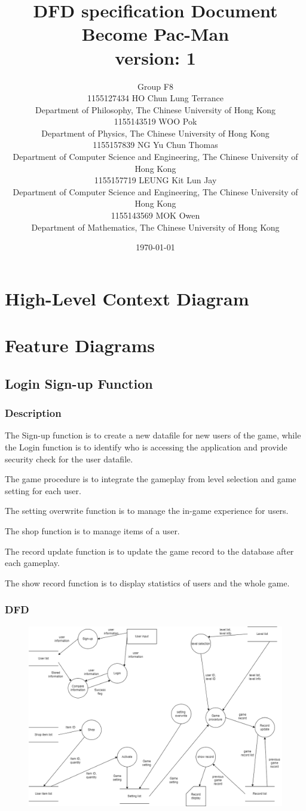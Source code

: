 \documentclass{article}
\title{DFD specification Document\\Become Pac-Man\\version: 1}
\author{Group F8\\1155127434 HO Chun Lung Terrance\\
Department of Philosophy, The Chinese University of Hong Kong\\1155143519 WOO Pok\\
Department of Physics, The Chinese University of Hong Kong\\1155157839 NG Yu Chun Thomas\\
Department of Computer Science and Engineering, The Chinese University of Hong Kong\\1155157719 LEUNG Kit Lun Jay\\
Department of Computer Science and Engineering, The Chinese University of Hong Kong\\1155143569 MOK Owen\\
Department of Mathematics, The Chinese University of Hong Kong}
\date{\today}
\begin{document}
\maketitle
\tableofcontents
\newpage

\section{High-Level Context Diagram}

\section{Feature Diagrams}
\subsection{Login Sign-up Function}
\subsubsection{Description}
\par The Sign-up function is to create a new datafile for new users of the game, while the Login function is to identify who is accessing the application and provide security check for the user datafile.
\par The game procedure is to integrate the gameplay from level selection and game setting for each user.
\par The setting overwrite function is to manage the in-game experience for users.
\par The shop function is to manage items of a user.
\par The record update function is to update the game record to the database after each gameplay.
\par The show record function is to display statistics of users and the whole game.
\subsubsection{DFD}
\begin{figure}[H]
    \centering
    \includegraphics*[scale=0.4]{gameflow_DFD.png}
\end{figure}
\end{document}
